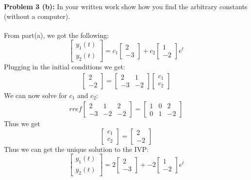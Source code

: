 \documentclass[12pt]{article}
\begin{document}
\noindent \textbf{Problem 3 (b): }In your written work show how you find the arbitrary constants (without a computer).
\\ \\
From part(a), we got the following:
$$
\begin{bmatrix} y_1(t) \\ y_2(t) \end{bmatrix} =
c_1 \begin{bmatrix}	2 \\ -3	\end{bmatrix} +
c_2 \begin{bmatrix}	1 \\ -2	\end{bmatrix} e^{t}
$$	
Plugging in the initial conditions we get:
\begin{align*}
\begin{bmatrix} 2 \\ -2 \end{bmatrix} =
\begin{bmatrix}	2  & 1 \\ -3 & -2	\end{bmatrix}
\begin{bmatrix}	c_1 \\ c_2	\end{bmatrix}
\end{align*}
We can now solve for $c_1$ and $c_2$:
\begin{align*}
rref
\begin{bmatrix}
2  & 1 & 2 \\ 
-3 & -2	& -2
\end{bmatrix} = 
\begin{bmatrix}
1 & 0 & 2 \\
0 & 1 & -2
\end{bmatrix}
\end{align*}
Thus we get
$$
\begin{bmatrix}	c_1 \\ c_2	\end{bmatrix} = \begin{bmatrix}	2 \\ -2	\end{bmatrix}
$$
Thus we can get the unique solution to the IVP:
$$
\begin{bmatrix} y_1(t) \\ y_2(t) \end{bmatrix} =
2 \begin{bmatrix}	2 \\ -3	\end{bmatrix} +
-2 \begin{bmatrix}	1 \\ -2	\end{bmatrix} e^{t}
$$
\end{document}
